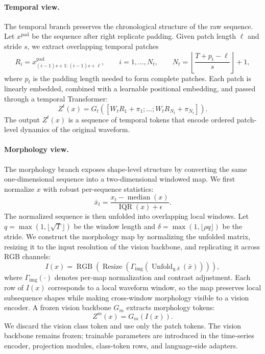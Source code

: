 \documentclass{article}
\begin{document}
\paragraph{Temporal view.}
The temporal branch preserves the chronological structure of the raw sequence.
Let $x^{\mathrm{pad}}$ be the sequence after right replicate padding. Given patch
length $\ell$ and stride $s$, we extract overlapping temporal patches
\begin{equation}
\label{eq:temporal-patches}
R_i=x^{\mathrm{pad}}_{(i-1)s+1:(i-1)s+\ell},
\qquad
 i=1,\ldots,N_t,
\qquad
N_t=\left\lfloor\frac{T+p_t-\ell}{s}\right\rfloor+1,
\end{equation}
where $p_t$ is the padding length needed to form complete patches. Each patch is
linearly embedded, combined with a learnable positional embedding, and passed
through a temporal Transformer:
\begin{equation}
\label{eq:temporal-encoder}
Z^{t}(x)
=
G_t
\left(
\left[
W_tR_1+\pi_1;
\ldots;
W_tR_{N_t}+\pi_{N_t}
\right]
\right).
\end{equation}
The output $Z^t(x)$ is a sequence of temporal tokens that encode ordered
patch-level dynamics of the original waveform.

\paragraph{Morphology view.}
The morphology branch exposes shape-level structure by converting the same
one-dimensional sequence into a two-dimensional windowed map. We first normalize
$x$ with robust per-sequence statistics:
\begin{equation}
\label{eq:robust-normalization}
\bar{x}_t
=
\frac{x_t-\operatorname{median}(x)}
{\operatorname{IQR}(x)+\epsilon}.
\end{equation}
The normalized sequence is then unfolded into overlapping local windows. Let
$q=\max(1,\lfloor\sqrt{T}\rfloor)$ be the window length and
$\delta=\max(1,\lfloor\rho q\rfloor)$ be the stride. We construct the morphology
map by normalizing the unfolded matrix, resizing it to the input resolution of
the vision backbone, and replicating it across RGB channels:
\begin{equation}
\label{eq:morphology-map}
I(x)
=
\operatorname{RGB}
\left(
\operatorname{Resize}
\left(
\Gamma_{\mathrm{img}}
\left(
\operatorname{Unfold}_{q,\delta}(\bar{x})
\right)
\right)
\right),
\end{equation}
where $\Gamma_{\mathrm{img}}(\cdot)$ denotes per-map normalization and contrast
adjustment. Each row of $I(x)$ corresponds to a local waveform window, so the map
preserves local subsequence shapes while making cross-window morphology visible
to a vision encoder. A frozen vision backbone $G_m$ extracts morphology tokens:
\begin{equation}
\label{eq:morphology-encoder}
Z^{m}(x)=G_m(I(x)).
\end{equation}
We discard the vision class token and use only the patch tokens. The vision
backbone remains frozen; trainable parameters are introduced in the time-series
encoder, projection modules, class-token rows, and language-side adapters.
\end{document}
